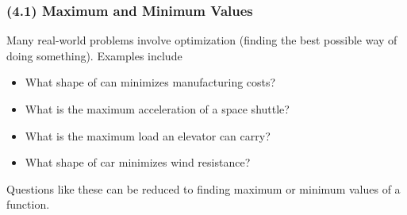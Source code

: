 \begin{frame}
\frametitle{(4.1) Maximum and Minimum Values}
Many real-world problems involve optimization (finding the best possible way of doing something).  Examples include
\begin{itemize}
\item  What shape of can minimizes manufacturing costs?
\item  What is the maximum acceleration of a space shuttle?
\item  What is the maximum load an elevator can carry?
\item  What shape of car minimizes wind resistance?
\end{itemize}
Questions like these can be reduced to finding maximum or minimum values of a function.
\end{frame}
